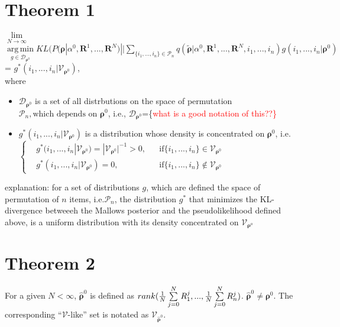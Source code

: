 \documentclass[11pt, oneside]{article}   	%
\begin{document}
\section{Theorem 1}
$\lim\limits_{N \rightarrow \infty}$ $\operatorname*{arg\,min}\limits_{g\in\mathcal{D}_{\bm{\rho}^0}} KL (P(\bm{\rho}|\alpha^0, \bm{R}^1, ...,\bm{R}^N ) || \sum\limits_{\{i_1,..., i_n\} \in \mathcal{P}_n} q (\tilde{\bm{\rho}}|\alpha^0, \bm{R}^1,..., \bm{R}^N, i_1,...,i_n) g(i_1,...,i_n|\bm{\rho}^0)$ \\
= $g^*(i_1,...,i_n|\mathcal{V}_{{\bm{\rho}}^0})$, \\ 
where 
\begin{itemize}
	\item{
		$\mathcal{D}_{\bm{\rho}^0}$ is a set of all distrbutions on the space of permutation $\mathcal{P}_n, \text{which depends on } \bm{\rho}^0$, i.e., $\mathcal{D}_{\bm{\rho}^0} $=\{\textcolor{red}{what is a good notation of this??\} } 
	}
	\item{
		$g^*(i_1, ..., i_n | \mathcal{V}_{\bm{\rho}^0})$ is a distribution whose density is concentrated on $\bm{\rho}^0$, i.e. \\
		  $
		\left \{
		\begin{aligned}
		&g^*(i_1, ..., i_n | \mathcal{V}_{\bm{\rho}^0}) = |\mathcal{V}_{\bm{\rho}^0}|^{-1}>0 , && \text{if} \{i_1,...,i_n\}\in \mathcal{V}_{\bm{\rho}^0}\\
		&g^*(i_1, ..., i_n | \mathcal{V}_{\bm{\rho}^0}) = 0 , && \text{if} \{i_1,...,i_n\}\notin \mathcal{V}_{\bm{\rho}^0}
		\end{aligned} \right.
		$	
	}

\end{itemize}

explanation: for a set of distributions $g$, which are defined the space of permutation of $n$ items, i.e.$\mathcal{P}_n$, the distribution $g^*$ that minimizes the KL-divergence betweeeh the Mallows posterior and the pseudolikelihood defined above, is a uniform distribution with its density concentrated on $\mathcal{V}_{\bm{\rho}^o}$

\section{Theorem 2}
For a given $N < \infty$, $\hat{\bm{\rho}}^0$ is defined as $rank({1\over N}\sum\limits_{j=0}^{N}R_1^j, ..., {1\over N}\sum\limits_{j=0}^{N}R_n^j)$. $\hat{\bm{\rho}}^0 \neq \bm{\rho}^0$. The corresponding ``$\mathcal{V}$-like'' set is notated as $\mathcal{V}_{\hat{\bm{\rho}}^0}$.
\end{document}

